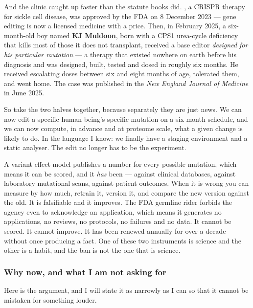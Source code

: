 And the clinic caught up faster than the statute books did. , a CRISPR therapy for
sickle cell disease, was approved by the FDA on 8 December 2023 --- gene editing is now a licensed
medicine with a price. Then, in February 2025, a six-month-old boy named \textbf{KJ Muldoon}, born
with a CPS1 urea-cycle deficiency that kills most of those it does not transplant, received a base
editor \emph{designed for his particular mutation} --- a therapy that existed nowhere on earth
before his diagnosis and was designed, built, tested and dosed in roughly six months. He received
escalating doses between six and eight months of age, tolerated them, and went home. The case was
published in the \emph{New England Journal of Medicine} in June 2025.

So take the two halves together, because separately they are just news. We can now edit a specific
human being's specific mutation on a six-month schedule, and we can now compute, in advance and at
proteome scale, what a given change is likely to do. In the language I know: we finally have a
staging environment and a static analyser. The edit no longer has to be the experiment.

\begin{funfact}
A variant-effect model publishes a number for every possible mutation, which means it can be
scored, and it \emph{has} been --- against clinical databases, against laboratory mutational scans,
against patient outcomes. When it is wrong you can measure by how much, retrain it, version it, and
compare the new version against the old. It is falsifiable and it improves. The FDA germline rider
forbids the agency even to acknowledge an application, which means it generates no applications, no
reviews, no protocols, no failures and no data. It cannot be scored. It cannot improve. It has been
renewed annually for over a decade without once producing a fact. One of these two instruments is
science and the other is a habit, and the ban is not the one that is science.
\end{funfact}

\subsubsection*{Why now, and what I am not asking for}

Here is the argument, and I will state it as narrowly as I can so that it cannot be mistaken for
something louder.

